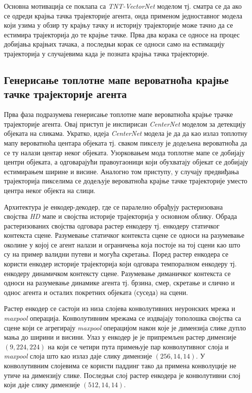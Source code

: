 \documentclass[11pt,oneside]{memoir}
\begin{document}
Основна мотивација се поклапа са \textit{TNT-VectorNet} моделом тј. сматра се да ако се одреди крајња тачка трајекторије агента, онда применом једноставног
модела који узима у обзир ту крајњу тачку и историју трајекторије може тачно да се естимира трајекторија до те крајње тачке. Прва два корака се односе
на процес добијања крајњих тачака, а последњи корак се односи само на естимацију трајекторија у случајевима када је позната крајња тачка трајекторије.

\subsection{Генерисање топлотне мапе вероватноћа крајње тачке трајекторије агента}

Прва фаза подразумева генерисање топлотне мапе вероватноћа крајње трачке трајекторије агента. Овај приступ је инспирисан \textit{CenterNet} 
моделом за детекцију објеката на сликама. Укратко, идеја \textit{CenterNet} модела је да да као излаз топлотну мапу вероватноћа центара објеката тј.
сваком пикселу је додељена вероватноћа да се ту налази центар неког објеката. Узорковањем мода топлотне мапе се добијају центри објеката,
а одговарајући правоугаоници који обухватају објекат се добијају естимирањем ширине и висине. Аналогно том приступу, у случају предвиђања
трајекторија пикселима се додељује вероватноћа крајње тачке трајекторије уместо центра неког објекта на слици. 

Архитектура је енкодер-декодер, где се паралелно обрађују растеризована својства \textit{HD} мапе и својства историје трајекторија у основном облику.
Обрада растеризованих својства одговара растер енкодеру тј. енкодеру статичког контекста сцене. Разумевање статичког контекста сцене се односи
на разумевање околине у којој се агент налази и ограничења која постоје на тој сцени као што су на пример валидни путеви и могућа скретања. 
Поред растер енкодера се користи енкодер историје трајекторија који одговара темпоралном енкодеру тј. енкодеру динамичком контексту сцене. 
Разумевање диманичког контекста се односи на разумевање динамике агента тј. брзина, смер, скретање и слично и однос агента и осталих
покретних објеката (суседа) на сцени.

Растер енкодер се састоји из низа слојева конволутивних неуронских мрежа и \textit{maxpool} операција. Конволутивним мрежама се издвајају
тополошка својства са сцене који се агрегирају \textit{maxpool} операцијом након које је димензија слике дупло мања до ширини и висини. 
Улаз у енкодер је је припремљен растер димензије $(9, 224, 224)$ на који се четири пута примењује пар конволутивног слоја и \textit{maxpool}
слоја што као излаз даје слику димензије $(256, 14, 14)$. У конволутивним слојевима се користи паддинг тако да примена конволуције не утиче
на димензију слике. Последњи слој растер енкодера је конволутивни слој који даје слику димензије
$(512, 14, 14)$. \cite{home}
\end{document}
